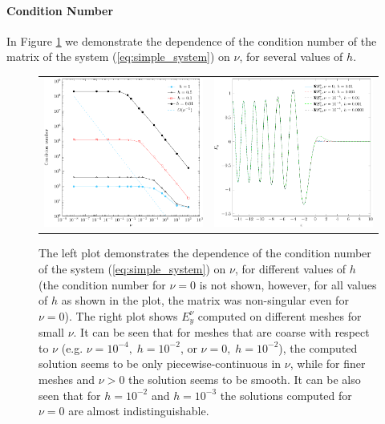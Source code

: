 \paragraph{Condition Number}
In Figure \ref{fig:small_nu} we demonstrate the dependence of the condition number of the matrix of the system (\ref{eq:simple_system}) 
on $\nu$, for several values of $h$.
\begin{figure}
\begin{tabular}{cc}
\includegraphics[height=0.3\textwidth]{pics_frequency_domain/fig_cond_num.pdf}&
 \includegraphics[height=0.3\textwidth]{pics_frequency_domain/ey_resonance.pdf}
 \end{tabular}
 \caption{
 The left plot demonstrates the dependence of the condition number of the system (\ref{eq:simple_system}) on $\nu$, for different values of $h$ (the condition 
 number for $\nu=0$ is not shown, however, for all values of $h$ as shown in the plot, the matrix was non-singular even for $\nu=0$). 
 The right plot shows $E_{y}^{\nu}$ computed on different meshes for small $\nu$. It can be seen that for meshes that are coarse 
 with respect to $\nu$ (e.g. $\nu=10^{-4}, \; h=10^{-2}$, or $\nu=0,\; h=10^{-2}$), the computed solution seems to be only piecewise-continuous in $\nu$, 
 while for finer meshes and $\nu>0$ the solution seems to be smooth. It can be also seen that for $h=10^{-2}$ and $h=10^{-3}$ the solutions 
 computed for $\nu=0$ are almost indistinguishable.}
 \label{fig:small_nu}
\end{figure}
